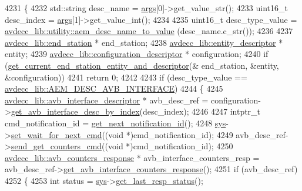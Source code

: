 \begin{DoxyCode}
4231 \{
4232     std::string desc\_name = \hyperlink{namespaceastime__fitline_a8187411843a6284ffb964ef3fb9fcab3}{args}[0]->get\_value\_str();
4233     uint16\_t desc\_index = \hyperlink{namespaceastime__fitline_a8187411843a6284ffb964ef3fb9fcab3}{args}[1]->get\_value\_int();
4234 
4235     uint16\_t desc\_type\_value = \hyperlink{namespaceavdecc__lib_1_1utility_a9f6076e32fa227555a95b6e95ea1e29b}{avdecc\_lib::utility::aem\_desc\_name\_to\_value}
      (desc\_name.c\_str());
4236 
4237     \hyperlink{classavdecc__lib_1_1end__station}{avdecc\_lib::end\_station} * end\_station;
4238     \hyperlink{classavdecc__lib_1_1entity__descriptor}{avdecc\_lib::entity\_descriptor} * entity;
4239     \hyperlink{classavdecc__lib_1_1configuration__descriptor}{avdecc\_lib::configuration\_descriptor} * configuration;
4240     \textcolor{keywordflow}{if} (\hyperlink{classcmd__line_ac2d4611fba7db03d436a2e3c1e64828e}{get\_current\_end\_station\_entity\_and\_descriptor}(&
      end\_station, &entity, &configuration))
4241         \textcolor{keywordflow}{return} 0;
4242 
4243     \textcolor{keywordflow}{if} (desc\_type\_value == \hyperlink{namespaceavdecc__lib_ac7b7d227e46bc72b63ee9e9aae15902fa5c354fe160628ac90da9257d8e0cb0ee}{avdecc\_lib::AEM\_DESC\_AVB\_INTERFACE})
4244     \{
4245         \hyperlink{classavdecc__lib_1_1avb__interface__descriptor}{avdecc\_lib::avb\_interface\_descriptor} * avb\_desc\_ref = 
      configuration->\hyperlink{classavdecc__lib_1_1configuration__descriptor_a177c390ccb74a31750b8eb0feb406144}{get\_avb\_interface\_desc\_by\_index}(desc\_index);
4246 
4247         intptr\_t cmd\_notification\_id = \hyperlink{classcmd__line_a57486218387d1aa9d262eb7c176154ad}{get\_next\_notification\_id}();
4248         \hyperlink{classcmd__line_a485db4800e331cb4052c447fdf5d154e}{sys}->\hyperlink{classavdecc__lib_1_1system_a26b769584f10225077da47583edda33e}{set\_wait\_for\_next\_cmd}((\textcolor{keywordtype}{void} *)cmd\_notification\_id);
4249         avb\_desc\_ref->\hyperlink{classavdecc__lib_1_1avb__interface__descriptor_ab657b0af297908406798934243812b7c}{send\_get\_counters\_cmd}((\textcolor{keywordtype}{void} *)cmd\_notification\_id);
4250         \hyperlink{classavdecc__lib_1_1avb__counters__response}{avdecc\_lib::avb\_counters\_response} * avb\_interface\_counters\_resp = 
      avb\_desc\_ref->\hyperlink{classavdecc__lib_1_1avb__interface__descriptor_a5e58a4aff6e0e7d5e05d6f211c64782d}{get\_avb\_interface\_counters\_response}();
4251         \textcolor{keywordflow}{if} (avb\_desc\_ref)
4252         \{
4253             \textcolor{keywordtype}{int} status = \hyperlink{classcmd__line_a485db4800e331cb4052c447fdf5d154e}{sys}->\hyperlink{classavdecc__lib_1_1system_aa63e8d1a4e51f695cdcccc9340922407}{get\_last\_resp\_status}();

\end{DoxyCode}
